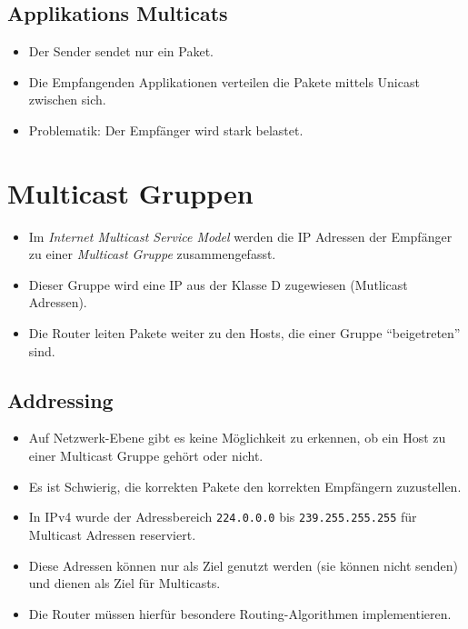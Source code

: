         \subsection{Applikations Multicats}
            \begin{itemize}
            	\item Der Sender sendet nur ein Paket.
            	\item Die Empfangenden Applikationen verteilen die Pakete mittels Unicast zwischen sich.
            	\item Problematik: Der Empfänger wird stark belastet.
            \end{itemize}

    \section{Multicast Gruppen}
        \begin{itemize}
        	\item Im \textit{Internet Multicast Service Model} werden die IP Adressen der Empfänger zu einer \textit{Multicast Gruppe} zusammengefasst.
        	\item Dieser Gruppe wird eine IP aus der Klasse D zugewiesen (Mutlicast Adressen).
        	\item Die Router leiten Pakete weiter zu den Hosts, die einer Gruppe \enquote{beigetreten} sind.
        \end{itemize}

        \subsection{Addressing}
            \begin{itemize}
            	\item Auf Netzwerk-Ebene gibt es keine Möglichkeit zu erkennen, ob ein Host zu einer Multicast Gruppe gehört oder nicht.
            	\item Es ist Schwierig, die korrekten Pakete den korrekten Empfängern zuzustellen.
            	\item In IPv4 wurde der Adressbereich \texttt{224.0.0.0} bis \texttt{239.255.255.255} für Multicast Adressen reserviert.
            	\item Diese Adressen können nur als Ziel genutzt werden (sie können nicht senden) und dienen als Ziel für Multicasts.
            	\item Die Router müssen hierfür besondere Routing-Algorithmen implementieren.
            \end{itemize}

